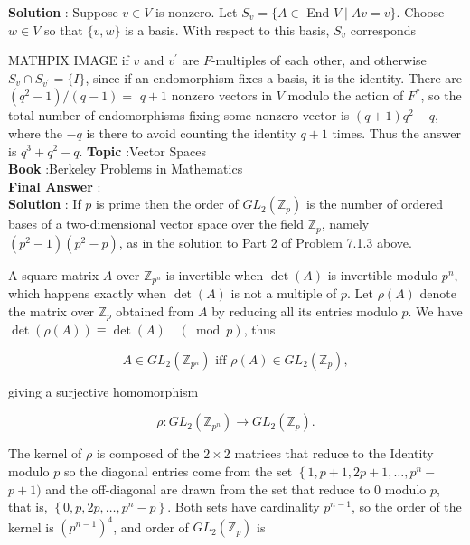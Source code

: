 \documentclass[10pt]{article}
\begin{document}
\textbf{Solution} : Suppose $v \in V$ is nonzero. Let $S_{v}=\{A \in$ End $V \mid A v=v\}$. Choose $w \in V$ so that $\{v, w\}$ is a basis. With respect to this basis, $S_{v}$ corresponds

MATHPIX IMAGE
if $v$ and $v^{\prime}$ are $F$-multiples of each other, and otherwise $S_{v} \cap S_{v^{\prime}}=\{I\}$, since if an endomorphism fixes a basis, it is the identity. There are $\left(q^{2}-1\right) /(q-1)=$ $q+1$ nonzero vectors in $V$ modulo the action of $F^{*}$, so the total number of endomorphisms fixing some nonzero vector is $(q+1) q^{2}-q$, where the $-q$ is there to avoid counting the identity $q+1$ times. Thus the answer is $q^{3}+q^{2}-q$.
\textbf{Topic} :Vector Spaces \\
\textbf{Book} :Berkeley Problems in Mathematics\\
\textbf{Final Answer} :\\


\textbf{Solution} : If $p$ is prime then the order of $G L_{2}\left(\mathbb{Z}_{p}\right)$ is the number of ordered bases of a two-dimensional vector space over the field $\mathbb{Z}_{p}$, namely $\left(p^{2}-1\right)\left(p^{2}-p\right)$, as in the solution to Part 2 of Problem 7.1.3 above.

A square matrix $A$ over $\mathbb{Z}_{p^{n}}$ is invertible when $\operatorname{det}(A)$ is invertible modulo $p^{n}$, which happens exactly when $\operatorname{det}(A)$ is not a multiple of $p$. Let $\rho(A)$ denote the matrix over $\mathbb{Z}_{p}$ obtained from $A$ by reducing all its entries modulo $p$. We have $\operatorname{det}(\rho(A)) \equiv \operatorname{det}(A) \quad(\bmod p)$, thus

$$
A \in G L_{2}\left(\mathbb{Z}_{p^{n}}\right) \text { iff } \rho(A) \in G L_{2}\left(\mathbb{Z}_{p}\right),
$$

giving a surjective homomorphism

$$
\rho: G L_{2}\left(\mathbb{Z}_{p^{n}}\right) \rightarrow G L_{2}\left(\mathbb{Z}_{p}\right) .
$$

The kernel of $\rho$ is composed of the $2 \times 2$ matrices that reduce to the Identity modulo $p$ so the diagonal entries come from the set $\left\{1, p+1,2 p+1, \ldots, p^{n}-\right.$ $p+1)$ and the off-diagonal are drawn from the set that reduce to 0 modulo $p$, that is, $\left\{0, p, 2 p, \ldots, p^{n}-p\right\}$. Both sets have cardinality $p^{n-1}$, so the order of the kernel is $\left(p^{n-1}\right)^{4}$, and order of $G L_{2}\left(\mathbb{Z}_{p}\right)$ is
\end{document}
